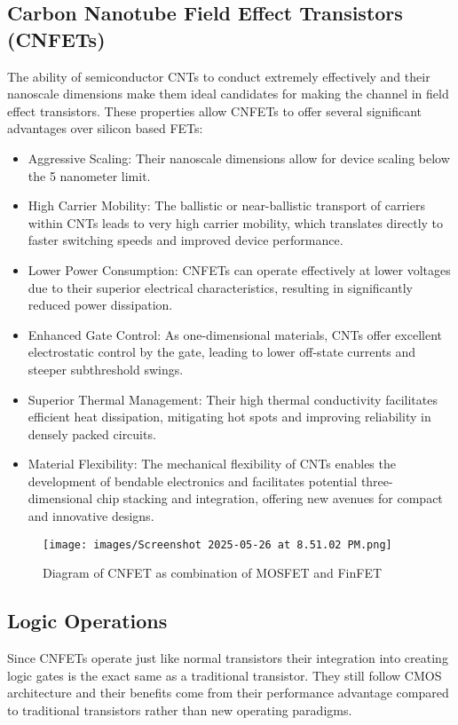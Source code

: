 \documentclass[sigconf,authordraft]{acmart}
\begin{document}
\subsection{Carbon Nanotube Field Effect Transistors (CNFETs)}
The ability of semiconductor CNTs to conduct extremely effectively 
and their nanoscale dimensions make them ideal candidates for 
making the channel in field effect transistors. These properties 
allow CNFETs to offer several significant advantages over silicon 
based FETs:
\begin{itemize}
  \item Aggressive Scaling: Their nanoscale dimensions allow for
  device scaling below the 5 nanometer limit.
  \item High Carrier Mobility: The ballistic or near-ballistic 
  transport of carriers within CNTs leads to very high carrier
  mobility, which translates directly to faster switching speeds 
  and improved device performance.
  \item Lower Power Consumption: CNFETs can operate effectively 
  at lower voltages due to their superior electrical 
  characteristics, resulting in significantly reduced power 
  dissipation.
  \item Enhanced Gate Control: As one-dimensional materials, 
  CNTs offer excellent electrostatic control by the gate, 
  leading to lower off-state currents and steeper subthreshold 
  swings.
  \item Superior Thermal Management: Their high thermal 
  conductivity facilitates efficient heat dissipation, 
  mitigating hot spots and improving reliability in densely 
  packed circuits.
  \item Material Flexibility: The mechanical flexibility of CNTs 
  enables the development of bendable electronics and facilitates 
  potential three-dimensional chip stacking and integration, 
  offering new avenues for compact and innovative designs.
\end{itemize}

\begin{figure}[h]
  \centering
  \texttt{[image: images/Screenshot 2025-05-26 at 8.51.02 PM.png]}
  \caption{Diagram of CNFET as combination of MOSFET and FinFET}
\end{figure}

\subsection{Logic Operations}
Since CNFETs operate just like normal transistors their integration 
into creating logic gates is the exact same as a traditional 
transistor. They still follow CMOS architecture and their benefits 
come from their performance advantage compared to traditional transistors rather than 
new operating paradigms. 
\end{document}
